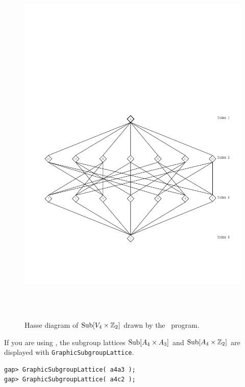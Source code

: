 \begin{enumerate}
\begin{figure}[h!]
\begin{center}
\includegraphics[height=18cm]{inputs/v4c2new.pdf}%
\caption{Hasse diagram of $\mathrm{Sub}[V_4 \times \mathbb{Z}_2]$ drawn by the \xgap\ program.}
\label{fig:v4c2}
\end{center}\end{figure}
\noindent If you are using \xgap, the subgroup lattices 
$\mathrm{Sub}[A_4 \times A_3]$ and $\mathrm{Sub}[A_4 \times \mathbb{Z}_2]$ are displayed with
{\tt GraphicSubgroupLattice}.  
{\codesize
\begin{verbatim}
gap> GraphicSubgroupLattice( a4a3 );
gap> GraphicSubgroupLattice( a4c2 );

\end{verbatim}}


\end{enumerate}
